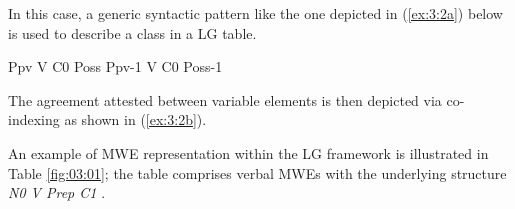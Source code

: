 \documentclass[output=paper]{langsci/langscibook}
\begin{document}
In this case, a generic syntactic pattern like the one depicted in (\ref{ex:3:2a})
below is used to describe a class in a LG table.

\begin{exe}
\ex
\begin{xlist} \label{ex:3:2a}
\ex Ppv V C0 Poss
\ex \label{ex:3:2b} Ppv-1 V C0 Poss-1
\end{xlist}
\end{exe}


The agreement attested between variable elements is then
depicted via co-indexing as shown in (\ref{ex:3:2b}).



An example of MWE representation within the LG framework is illustrated
in Table \ref{fig:03:01}; the table comprises verbal MWEs with the underlying
structure \textit{N0 V Prep C1} \citep{fotopoulou1993}.

\end{document}
